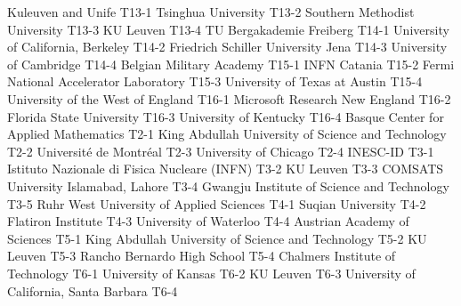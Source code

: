 \begin{multicols}{2}
{Kuleuven and Unife}
{T13-1}
{}
{Tsinghua University}
{T13-2}
{}
{Southern Methodist University}
{T13-3}
{}
{KU Leuven}
{T13-4}
{}
{TU Bergakademie Freiberg}
{T14-1}
{}
{University of California, Berkeley}
{T14-2}
{}
{Friedrich Schiller University Jena}
{T14-3}
{}
{University of Cambridge}
{T14-4}
{}
{Belgian Military Academy}
{T15-1}
{}
{INFN Catania}
{T15-2}
{}
{Fermi National Accelerator Laboratory}
{T15-3}
{}
{University of Texas at Austin}
{T15-4}
{}
{University of the West of England}
{T16-1}
{}
{Microsoft Research New England}
{T16-2}
{}
{Florida State University}
{T16-3}
{}
{University of Kentucky}
{T16-4}
{}
{Basque Center for Applied Mathematics}
{T2-1}
{}
{King Abdullah University of Science and Technology}
{T2-2}
{}
{Université de Montréal}
{T2-3}
{}
{University of Chicago}
{T2-4}
{}
{INESC-ID}
{T3-1}
{}
{Istituto Nazionale di Fisica Nucleare (INFN)}
{T3-2}
{}
{KU Leuven}
{T3-3}
{}
{COMSATS University Islamabad, Lahore}
{T3-4}
{}
{Gwangju Institute of Science and Technology}
{T3-5}
{}
{Ruhr West University of Applied Sciences}
{T4-1}
{}
{Suqian University}
{T4-2}
{}
{Flatiron Institute}
{T4-3}
{}
{University of Waterloo}
{T4-4}
{}
{Austrian Academy of Sciences}
{T5-1}
{}
{King Abdullah University of Science and Technology}
{T5-2}
{}
{KU Leuven}
{T5-3}
{}
{Rancho Bernardo High School}
{T5-4}
{}
{Chalmers Institute of Technology}
{T6-1}
{}
{University of Kansas}
{T6-2}
{}
{KU Leuven}
{T6-3}
{}
{University of California, Santa Barbara}
{T6-4}
{}

\end{multicols}
